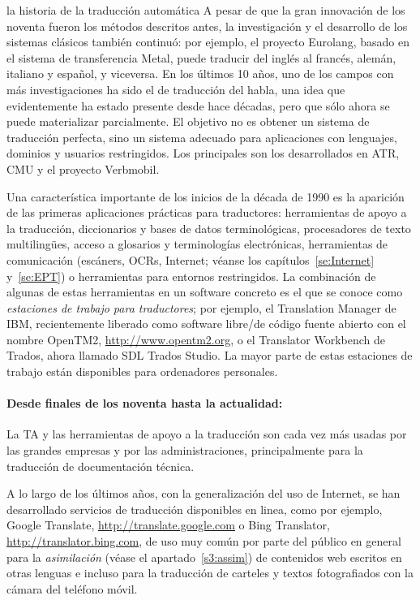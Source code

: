 \begin{persabermes}{la historia de la traducción automática}
A pesar de que la gran innovación de los noventa fueron los métodos descritos antes, la investigación y el desarrollo de los sistemas clásicos también continuó: por ejemplo, el proyecto Eurolang, basado en el sistema de transferencia Metal, puede traducir del inglés al francés, alemán, italiano y español, y viceversa. En los últimos 10 años, uno de los campos con más investigaciones ha sido el de traducción del habla, una idea que evidentemente ha estado presente desde hace décadas, pero que sólo ahora se puede materializar parcialmente. El objetivo no es obtener un sistema de traducción perfecta, sino un sistema adecuado para aplicaciones con lenguajes, dominios y usuarios restringidos. Los principales son los desarrollados en ATR, CMU y el proyecto Verbmobil. 

Una característica importante de los inicios de la década de 1990 es la aparición de las primeras aplicaciones prácticas para traductores: herramientas de apoyo a la traducción, diccionarios y bases de datos terminológicas, procesadores de texto multilingües, acceso a glosarios y terminologías electrónicas, herramientas de comunicación (escáners, OCRs, Internet; véanse los capítulos~\ref{se:Internet} y~\ref{se:EPT}) o herramientas para entornos restringidos. La combinación de algunas de estas herramientas en un software concreto es el que se conoce como \emph{estaciones de trabajo para traductores}; por ejemplo, el Translation Manager de IBM, recientemente liberado como software libre/de código fuente abierto con el nombre OpenTM2, \url{http://www.opentm2.org}, o el Translator Workbench de Trados, ahora llamado SDL Trados Studio. La mayor parte de estas estaciones de trabajo están disponibles para ordenadores personales. 

\paragraph{Desde finales de los noventa hasta la actualidad:} La TA y las herramientas de apoyo a la traducción son cada vez más usadas por las grandes empresas y por las administraciones, principalmente para la traducción de documentación técnica. 

A lo largo de los últimos años, con la generalización del uso de Internet, se han desarrollado servicios de traducción disponibles en linea, como por ejemplo, Google Translate, \url{http://translate.google.com} o Bing Translator, \url{http://translator.bing.com}, de uso muy común por parte del público en general para la \emph{asimilación} (véase el apartado~\ref{s3:assim}) de contenidos web escritos en otras lenguas e incluso para la traducción de carteles y textos fotografiados con la cámara del teléfono móvil. 


\end{persabermes}
